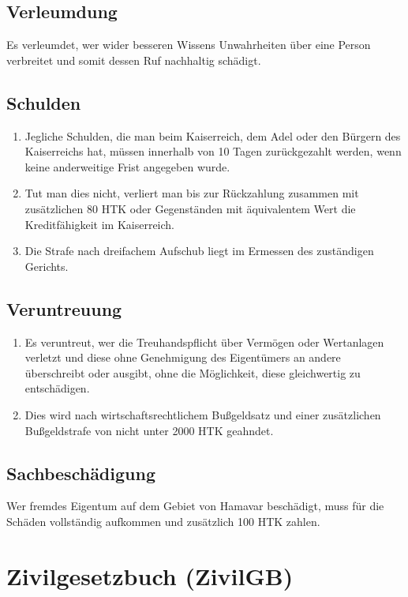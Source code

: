 \documentclass{article}
\begin{document}
\subsection{Verleumdung}
Es verleumdet, wer wider besseren Wissens Unwahrheiten über eine Person verbreitet und somit dessen Ruf nachhaltig schädigt.

\subsection{Schulden}
\begin{enumerate}[(1)]
    \item Jegliche Schulden, die man beim Kaiserreich, dem Adel oder den Bürgern des Kaiserreichs hat, müssen innerhalb von 10 Tagen zurückgezahlt werden, wenn keine anderweitige Frist angegeben wurde.
    \item Tut man dies nicht, verliert man bis zur Rückzahlung zusammen mit zusätzlichen 80 HTK oder Gegenständen mit äquivalentem Wert die Kreditfähigkeit im Kaiserreich.
    \item Die Strafe nach dreifachem Aufschub liegt im Ermessen des zuständigen Gerichts.    
\end{enumerate}

\subsection{Veruntreuung}
\begin{enumerate}[(1)]
    \item Es veruntreut, wer die Treuhandspflicht über Vermögen oder Wertanlagen verletzt und diese ohne Genehmigung des Eigentümers an andere überschreibt oder ausgibt, ohne die Möglichkeit, diese gleichwertig zu entschädigen.
    \item Dies wird nach wirtschaftsrechtlichem Bußgeldsatz und einer zusätzlichen Bußgeldstrafe von nicht unter 2000 HTK geahndet.
\end{enumerate}

\subsection{Sachbeschädigung}
Wer fremdes Eigentum auf dem Gebiet von Hamavar beschädigt, muss für die Schäden vollständig aufkommen und zusätzlich 100 HTK zahlen.

\newpage
\section{Zivilgesetzbuch (ZivilGB)}
\localtableofcontents
\end{document}
